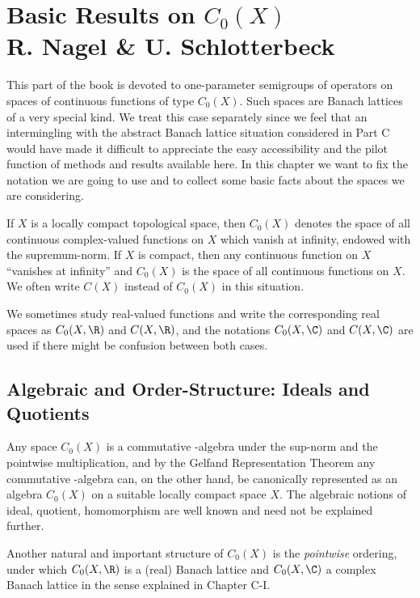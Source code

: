 
\chapter{Basic Results on $C_{0}(X)$ \\
R. Nagel \& U. Schlotterbeck}\label{chap:B-I}
This part of the book is devoted to one-parameter semigroups of operators on spaces of continuous functions of type $C_{0}(X)$.
Such spaces are Banach lattices of a very special kind.
We treat this case separately since we feel that an intermingling with the abstract Banach lattice situation considered in Part C would have made it difficult to appreciate the easy accessibility and the pilot function of methods and results available here.
In this chapter we want to fix the notation we are going to use and to collect some basic facts about the spaces we are considering.

If $X$ is a locally compact topological space, then $C_{0}(X)$ denotes the space of all continuous complex-valued functions on $X$ which vanish at infinity, endowed with the supremum-norm.
If $X$ is compact, then any continuous function on $X$ \enquote{vanishes at infinity} and $C_{0}(X)$ is the space of all continuous functions on $X$.
We often write $C(X)$ instead of $C_{0}(X)$ in this situation.

We sometimes study real-valued functions and write the corresponding real spaces as $C_{0}(X,\R)$ and 
$C(X,\R)$, and the notations $C_{0}(X,\C)$ and $C(X,\C)$ are used if there might be confusion between both cases.
\section{Algebraic and Order-Structure: Ideals and Quotients}\label{sec:b1-1.1}
Any space $C_{0}(X)$ is a commutative \CA-algebra under the sup-norm and the pointwise multiplication, and by the Gelfand Representation Theorem any commutative \CA-algebra can, on the other hand, be canonically represented as an algebra $C_{0}(X)$ on a suitable locally compact space $X$.
The algebraic notions of ideal, quotient, homomorphism are well known and need not be explained further.

Another natural and important structure of $C_{0}(X)$ is the \emph{pointwise} ordering, under which $C_{0}(X,\R)$ is a (real) Banach lattice and $C_{0}(X,\C)$ a complex Banach lattice in the sense explained in Chapter C-I.

